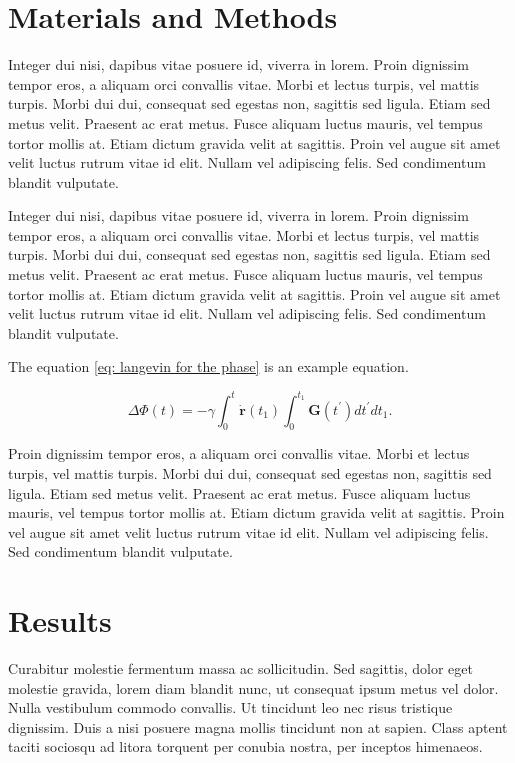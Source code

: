 \documentclass[a4paper,10pt,twocolumn]{article}
\begin{document}
\section*{Materials and Methods}

Integer dui nisi, dapibus vitae posuere id, viverra in lorem. Proin dignissim tempor eros, a aliquam orci convallis vitae. Morbi et lectus turpis, vel mattis turpis. Morbi dui dui, consequat sed egestas non, sagittis sed ligula. Etiam sed metus velit. Praesent ac erat metus. Fusce aliquam luctus mauris, vel tempus tortor mollis at. Etiam dictum gravida velit at sagittis. Proin vel augue sit amet velit luctus rutrum vitae id elit. Nullam vel adipiscing felis. Sed condimentum blandit vulputate.

Integer dui nisi, dapibus vitae posuere id, viverra in lorem. Proin dignissim tempor eros, a aliquam orci convallis vitae. Morbi et lectus turpis, vel mattis turpis. Morbi dui dui, consequat sed egestas non, sagittis sed ligula. Etiam sed metus velit. Praesent ac erat metus. Fusce aliquam luctus mauris, vel tempus tortor mollis at. Etiam dictum gravida velit at sagittis. Proin vel augue sit amet velit luctus rutrum vitae id elit. Nullam vel adipiscing felis. Sed condimentum blandit vulputate.

The equation \eqref{eq: langevin for the phase} is an example equation.

\begin{equation}
    \Delta \Phi(t) =-\gamma \int_{0}^{t} \dot{\mathbf{r}}\left(t_{1}\right) \int_{0}^{t_{1}} \mathbf{G}\left(t^{\prime}\right) d t^{\prime} d t_{1}.
    \label{eq: langevin for the phase}
\end{equation}

Proin dignissim tempor eros, a aliquam orci convallis vitae. Morbi et lectus turpis, vel mattis turpis. Morbi dui dui, consequat sed egestas non, sagittis sed ligula. Etiam sed metus velit. Praesent ac erat metus. Fusce aliquam luctus mauris, vel tempus tortor mollis at. Etiam dictum gravida velit at sagittis. Proin vel augue sit amet velit luctus rutrum vitae id elit. Nullam vel adipiscing felis. Sed condimentum blandit vulputate.

\section*{Results}

Curabitur molestie fermentum massa ac sollicitudin. Sed sagittis, dolor eget molestie gravida, lorem diam blandit nunc, ut consequat ipsum metus vel dolor. Nulla vestibulum commodo convallis. Ut tincidunt leo nec risus tristique dignissim. Duis a nisi posuere magna mollis tincidunt non at sapien. Class aptent taciti sociosqu ad litora torquent per conubia nostra, per inceptos himenaeos.
\end{document}
